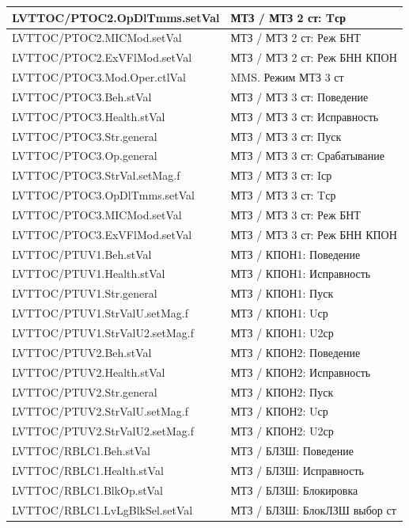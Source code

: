 \begin{longtable}{|>{\raggedright\arraybackslash}m{}|>{\raggedright\arraybackslash}m{}|}
\hline
LVTTOC/PTOC2.OpDlTmms.setVal & МТЗ / МТЗ 2 ст: Tср \\
\hline
LVTTOC/PTOC2.MICMod.setVal & МТЗ / МТЗ 2 ст: Реж БНТ \\
\hline
LVTTOC/PTOC2.ExVFlMod.setVal & МТЗ / МТЗ 2 ст: Реж БНН КПОН \\
\hline
LVTTOC/PTOC3.Mod.Oper.ctlVal & MMS. Режим МТЗ 3 ст \\
\hline
LVTTOC/PTOC3.Beh.stVal & МТЗ / МТЗ 3 ст: Поведение \\
\hline
LVTTOC/PTOC3.Health.stVal & МТЗ / МТЗ 3 ст: Исправность \\
\hline
LVTTOC/PTOC3.Str.general & МТЗ / МТЗ 3 ст: Пуск \\
\hline
LVTTOC/PTOC3.Op.general & МТЗ / МТЗ 3 ст: Срабатывание \\
\hline
LVTTOC/PTOC3.StrVal.setMag.f & МТЗ / МТЗ 3 ст: Iср \\
\hline
LVTTOC/PTOC3.OpDlTmms.setVal & МТЗ / МТЗ 3 ст: Tср \\
\hline
LVTTOC/PTOC3.MICMod.setVal & МТЗ / МТЗ 3 ст: Реж БНТ \\
\hline
LVTTOC/PTOC3.ExVFlMod.setVal & МТЗ / МТЗ 3 ст: Реж БНН КПОН \\
\hline
LVTTOC/PTUV1.Beh.stVal & МТЗ / КПОН1: Поведение \\
\hline
LVTTOC/PTUV1.Health.stVal & МТЗ / КПОН1: Исправность \\
\hline
LVTTOC/PTUV1.Str.general & МТЗ / КПОН1: Пуск \\
\hline
LVTTOC/PTUV1.StrValU.setMag.f & МТЗ / КПОН1: Uср \\
\hline
LVTTOC/PTUV1.StrValU2.setMag.f & МТЗ / КПОН1: U2ср \\
\hline
LVTTOC/PTUV2.Beh.stVal & МТЗ / КПОН2: Поведение \\
\hline
LVTTOC/PTUV2.Health.stVal & МТЗ / КПОН2: Исправность \\
\hline
LVTTOC/PTUV2.Str.general & МТЗ / КПОН2: Пуск \\
\hline
LVTTOC/PTUV2.StrValU.setMag.f & МТЗ / КПОН2: Uср \\
\hline
LVTTOC/PTUV2.StrValU2.setMag.f & МТЗ / КПОН2: U2ср \\
\hline
LVTTOC/RBLC1.Beh.stVal & МТЗ / БЛЗШ: Поведение \\
\hline
LVTTOC/RBLC1.Health.stVal & МТЗ / БЛЗШ: Исправность \\
\hline
LVTTOC/RBLC1.BlkOp.stVal & МТЗ / БЛЗШ: Блокировка \\
\hline
LVTTOC/RBLC1.LvLgBlkSel.setVal & МТЗ / БЛЗШ: БлокЛЗШ выбор ст \\

\end{longtable}
